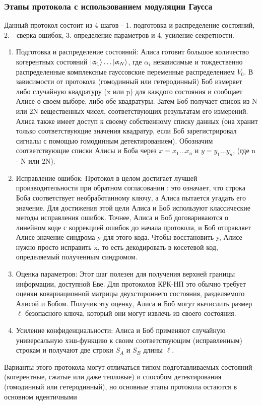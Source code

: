 \subsubsection{Этапы протокола с использованием модуляции Гаусса}
Данный протокол состоит из 4 шагов - 1. подготовка и распределение состояний, 2. - сверка ошибок, 3. определение параметров и 4. усиление секретности. 
\begin{enumerate}
    \item Подготовка и распределение состояний: Алиса готовит большое количество когерентных состояний $\lvert\upalpha_1\rangle \dots \lvert\upalpha_N\rangle $, где $\alpha_i$ независимые и тождественно распределенные комплексные гауссовские переменные распределением $V_0$. В зависимости от протокола (гомодинный или гетеродинный) Боб измеряет либо случайную квадратуру (x или p) для каждого состояния и сообщает Алисе о своем выборе, либо обе квадратуры. Затем Боб получает список из N или 2N вещественных чисел, соответствующих результатам его измерений. Алиса также имеет доступ к своему собственному списку данных (она хранит только соответствующие значения квадратур, если Боб зарегистрировал сигналы с помощью гомодинным детектированием). Обозначим соответствующие списки Алисы и Боба через  $x = {x_1 \dots x_n}$ и $y = {y_1 \dots y_n}$, (где n - N или 2N).
    \item Исправление ошибок: Протокол в целом достигает лучшей производительности при обратном согласовании : это означает, что строка Боба соответствует необработанному ключу, а Алиса пытается угадать его значение. Для достижения этой цели Алиса и Боб используют классические методы исправления ошибок. Точнее, Алиса и Боб договариваются о линейном коде с коррекцией ошибок до начала протокола, и Боб отправляет Алисе значение синдрома y для этого кода. Чтобы восстановить y, Алисе нужно просто исправить x, то есть декодировать в косетевой код, определяемый полученным синдромом. 
    \item Оценка параметров: Этот шаг полезен для получения верхней границы информации, доступной Еве. Для протоколов КРК-НП это обычно требует оценки ковариационной матрицы двухстороннего состояния, разделяемого Алисой и Бобом. Получив эту оценку, Алиса и Боб могут вычислить размер $\ell$ безопасного ключа, который они могут извлечь из своего состояния.
    \item Усиление конфиденциальности: Алиса и Боб применяют случайную универсальную хэш-функцию к своим соответствующим (исправленным) строкам и получают две строки $S_A$  и $S_B$ длины $\ell$.
\end{enumerate}
Варианты этого протокола могут отличаться типом подготавливаемых состояний (когерентные, сжатые или даже тепловые) и способом детектирования (гомодинный или гетеродинный), но основные этапы протокола остаются в основном идентичными

